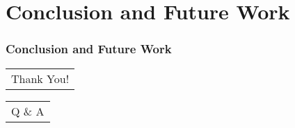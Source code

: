 \section{Conclusion and Future Work}\label{sec:conclusion}

\begin{frame}
  \frametitle{Conclusion and Future Work}
\end{frame}

\begin{frame}
  \begin{tabular}[h]{c}
    Thank You!
  \end{tabular}
\end{frame}

\begin{frame}
  \begin{tabular}[h]{c}
    Q \& A
  \end{tabular}
\end{frame}